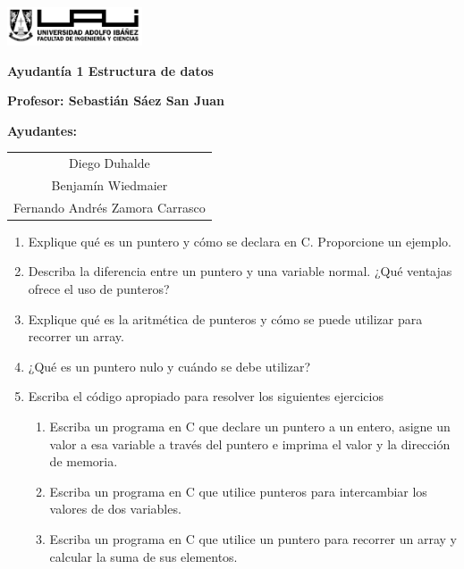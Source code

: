\documentclass[12pt]{article}
\begin{document}
\begin{titlepage}
    \centering
    \includegraphics[width=0.3\textwidth]{../imgs/logo-uai-fic.png}
    
    \vspace{0.5cm}
    \textbf{\fontsize{12}{24} Ayudantía 1 Estructura de datos}
    
    \vspace{0.5cm}
    \textbf{\fontsize{12}{24}\selectfont Profesor: Sebastián Sáez San Juan}
    
    \begin{center}
        \textbf{\fontsize{12}{24}\selectfont Ayudantes:}
    \end{center}
    \vspace{-0.8cm}
    \begin{center}
        \renewcommand{\arraystretch}{1.5}
        \begin{tabular}{c}
            Diego Duhalde \\ 
            Benjamín Wiedmaier \\ 
            Fernando Andrés Zamora Carrasco
        \end{tabular}
    \end{center}
    \vspace{0cm}

\begin{enumerate}
    \item Explique qué es un puntero y cómo se declara en C. Proporcione un ejemplo.
    \item Describa la diferencia entre un puntero y una variable normal. 
    ¿Qué ventajas ofrece el uso de punteros?
    \item Explique qué es la aritmética de punteros y cómo se puede utilizar para recorrer un array.
    \item ¿Qué es un puntero nulo y cuándo se debe utilizar?

    \item Escriba el código apropiado para resolver los siguientes ejercicios
        \begin{enumerate}[label=\alph*)]
            \item Escriba un programa en C que declare un puntero a un entero, asigne un valor a esa variable a través del puntero e imprima el valor y la dirección de memoria.
            \item Escriba un programa en C que utilice punteros para intercambiar los valores de dos variables.
            \item Escriba un programa en C que utilice un puntero para recorrer un array y calcular la suma de sus elementos.
        \end{enumerate}
\end{enumerate}
\end{titlepage}
\end{document}
